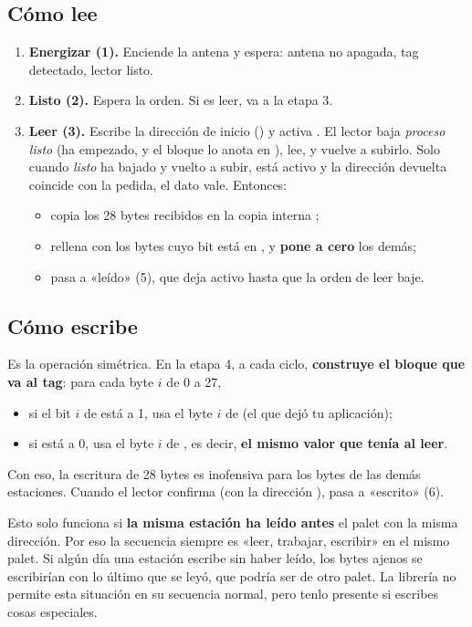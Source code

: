 \subsection{Cómo lee}
\begin{enumerate}
\item \textbf{Energizar (1).} Enciende la antena y espera: antena no apagada, tag detectado, lector listo.
\item \textbf{Listo (2).} Espera la orden. Si es leer, va a la etapa 3.
\item \textbf{Leer (3).} Escribe la dirección de inicio () y activa . El lector baja \emph{proceso listo} (ha empezado, y el bloque lo anota en ), lee, y vuelve a subirlo. Solo cuando \emph{listo} ha bajado y vuelto a subir,  está activo y la dirección devuelta coincide con la pedida, el dato vale. Entonces:
  \begin{itemize}
  \item copia los 28 bytes recibidos en la copia interna ;
  \item rellena  con los bytes cuyo bit está en , y \textbf{pone a cero} los demás;
  \item pasa a «leído» (5), que deja  activo hasta que la orden de leer baje.
  \end{itemize}
\end{enumerate}

\subsection{Cómo escribe}
Es la operación simétrica. En la etapa 4, a cada ciclo, \textbf{construye el bloque que va al tag}: para cada byte $i$ de 0 a 27,
\begin{itemize}
\item si el bit $i$ de  está a 1, usa el byte $i$ de  (el que dejó tu aplicación);
\item si está a 0, usa el byte $i$ de , es decir, \textbf{el mismo valor que tenía al leer}.
\end{itemize}
Con eso, la escritura de 28 bytes es inofensiva para los bytes de las demás estaciones. Cuando el lector confirma (con la dirección ), pasa a «escrito» (6).

\begin{peligro}
Esto solo funciona si \textbf{la misma estación ha leído antes} el palet con la misma dirección. Por eso la secuencia siempre es «leer, trabajar, escribir» en el mismo palet. Si algún día una estación escribe sin haber leído, los bytes ajenos se escribirían con lo último que se leyó, que podría ser de otro palet. La librería no permite esta situación en su secuencia normal, pero tenlo presente si escribes cosas especiales.
\end{peligro}

